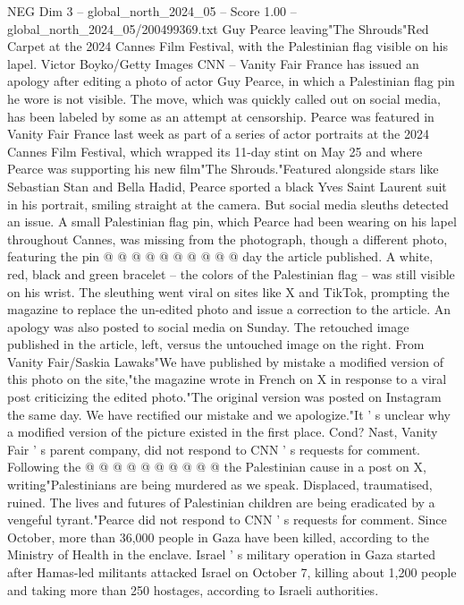 \begin{textsample}{NEG Dim 3 – global\_north\_2024\_05 – Score 1.00 – global\_north\_2024\_05/200499369.txt}  \label{ex:f3_neg_440}
Guy Pearce leaving"The Shrouds"Red Carpet at the 2024 Cannes Film Festival, with the Palestinian flag visible on his lapel.
Victor Boyko/Getty Images CNN -- Vanity Fair France has issued an apology after editing a photo of actor Guy Pearce, in which a Palestinian flag pin he wore is not visible.
The move, which was quickly called out on social media, has been labeled by some as an attempt at censorship.
Pearce was featured in Vanity Fair France last week as part of a series of actor portraits at the 2024 Cannes Film Festival, which wrapped its 11-day stint on May 25 and where Pearce was supporting his new film"The Shrouds."Featured alongside stars like Sebastian Stan and Bella Hadid, Pearce sported a black Yves Saint Laurent suit in his portrait, smiling straight at the camera.
But social media sleuths detected an issue.
A small Palestinian flag pin, which Pearce had been wearing on his lapel throughout Cannes, was missing from the photograph, though a different photo, featuring the pin @ @ @ @ @ @ @ @ @ @ day the article published.
A white, red, black and green bracelet -- the colors of the Palestinian flag -- was still visible on his wrist.
The sleuthing went viral on sites like X and TikTok, prompting the magazine to replace the un-edited photo and issue a correction to the article.
An apology was also posted to social media on Sunday.
The retouched image published in the article, left, versus the untouched image on the right.
From Vanity Fair/Saskia Lawaks"We have published by mistake a modified version of this photo on the site,"the magazine wrote in French on X in response to a viral post criticizing the edited photo."The original version was posted on Instagram the same day.
We have rectified our mistake and we apologize."It ' s unclear why a modified version of the picture existed in the first place.
Cond?
Nast, Vanity Fair ' s parent company, did not respond to CNN ' s requests for comment.
Following the @ @ @ @ @ @ @ @ @ @ the Palestinian cause in a post on X, writing"Palestinians are being murdered as we speak.
Displaced, traumatised, ruined.
The lives and futures of Palestinian children are being eradicated by a vengeful tyrant."Pearce did not respond to CNN ' s requests for comment.
Since October, more than 36,000 people in Gaza have been killed, according to the Ministry of Health in the enclave.
Israel ' s military operation in Gaza started after Hamas-led militants attacked Israel on October 7, killing about 1,200 people and taking more than 250 hostages, according to Israeli authorities.

\end{textsample}
